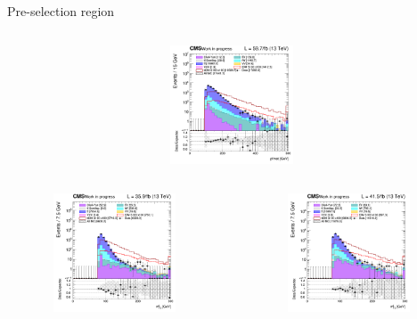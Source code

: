 \documentclass[8pt]{beamer}
\begin{document}
\begin{frame}{Pre-selection region}
\begin{columns}
\begin{column}{0.33\textwidth}
			\begin{center}
			\vspace{-8pt}
			\begin{block}{}\end{block}\vspace{10pt}
     			\includegraphics[width=1.0\textwidth, height=100pt]{figs/2018/SmearSR-ttDM-scalar100/log_cratio_topCR_ll_METcorrected_pt.png}
    		\end{center}		
		\end{column}
\end{columns}
\vspace{-5pt}
\begin{columns}
		\begin{column}{0.33\textwidth}
			\begin{center}
     			\includegraphics[width=1.0\textwidth, height=100pt]{figs/2016/SmearSR-ttDM-scalar100/log_cratio_topCR_ll_mt2ll.png}
    		\end{center}		
		\end{column}
		\begin{column}{0.33\textwidth}
			\begin{center}
     			\includegraphics[width=1.0\textwidth, height=100pt]{figs/2017/SmearSR-ttDM-scalar100/log_cratio_topCR_ll_mt2ll.png}

\end{center}
\end{column}
\end{columns}
\end{frame}
\end{document}
